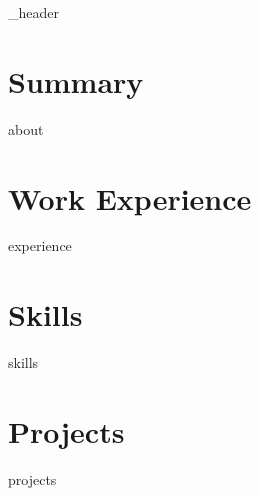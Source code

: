 \documentclass[line, letter, 14pt]{article}
\author{Ilya Kazakov}
\begin{document}
{_header}
\vspace*{1pt}

\hline
\vspace*{10pt}

\section{Summary}\label{sec:about}
\vspace*{3pt}
{about}
\vspace*{10pt}

\section{Work Experience}\label{sec:work-experience}
\vspace*{3pt}
{experience}
\vspace*{10pt}

\section{Skills}\label{sec:skills}
\vspace*{3pt}
{skills}
\vspace*{10pt}

\section{Projects}\label{sec:projects}
\vspace*{3pt}
{projects}
\vspace*{10pt}
\end{document}
